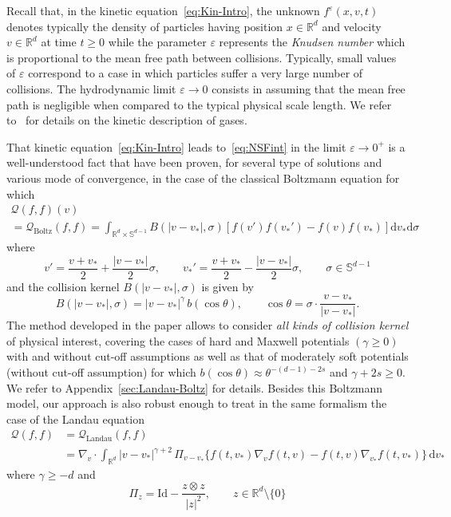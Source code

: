 \documentclass[AHL,Unicode,longabstracts,published]{cedram}
\newcommand{\Id}{\mathrm{Id}}
\renewcommand{\d}{\mathrm{d}}
\newcommand{\rLandau}{\mathrm{Landau}}
\newcommand{\rBoltz}{\mathrm{Boltz}}
\newcommand{\R}{\mathbb{R}}
\renewcommand{\S}{\mathbb{S}}
\newcommand{\QQ}{\mathcal{Q}}
\renewcommand*\ge{\geqslant}
\renewcommand*\geq{\geqslant}
\newcommand*\eps{{\varepsilon}}
\begin{document}
Recall that, in the kinetic equation~\eqref{eq:Kin-Intro}, the unknown $f^\eps(x,v,t)$ denotes typically the density of particles having position $x \in \R^{d}$ and velocity $v \in \R^{d}$ at time $t\geq0$ while the parameter $\eps$ represents the \emph{Knudsen number} which is proportional to the mean free path between collisions. Typically, small values of $\eps$ correspond to a case in which particles suffer a very large number of collisions. The hydrodynamic limit $\eps \to 0$ consists in assuming that the mean free path is negligible when compared to the typical physical scale length. We refer to~\cite{Cercignani,Sone} for details on the kinetic description of gases.

That kinetic equation~\eqref{eq:Kin-Intro} leads to~\eqref{eq:NSFint} in the limit $\eps \to 0^{+}$ is a well-understood fact that have been proven, for several type of solutions and various mode of convergence, in the case of the classical Boltzmann equation for which
\begin{multline}\label{eq:QQBoltz}
\QQ(f,f)(v)\\
=\QQ_{\rBoltz}(f,f)=\int_{\R^{d}\times\S^{d-1}}B(|v-v_{*}|,\sigma)\left[f(v')f(v_{*}')-f(v)f(v_{*})\right]\d v_{*}\d\sigma
\end{multline}
where
\[
v'=\frac{v+v_*}{2}+\frac{|v-v_*|}{2}\sigma, \qquad v_{*}'=\frac{v+v_*}{2}-\frac{|v-v_*|}{2}\sigma, \qquad \sigma \in \S^{d-1}
\]
and the collision kernel $B(|v-v_{*}|,\sigma)$ is given by
\[
B(|v-v_{*}|,\sigma)=|v-v_{*}|^{\gamma}\,b(\cos\theta), \qquad \cos \theta=\sigma \cdot \frac{v-v_{*}}{|v-v_{*}|}.
\]
The method developed in the paper allows to consider \emph{all kinds of collision kernel} of physical interest, covering the cases of hard {and Maxwell} potentials $(\gamma \ge 0)$ with and without cut-off assumptions as well as that of moderately soft potentials {(without cut-off assumption) for which $b(\cos \theta) \approx \theta^{-(d-1) - 2 s}$ and $\gamma + 2 s \ge 0$}. We refer to Appendix~\ref{sec:Landau-Boltz} for details. Besides this Boltzmann model, our approach is also robust enough to treat in the same formalism the case of the Landau equation
\begin{align*}
\QQ(f,f)&=\QQ_{\rLandau}(f,f)\\
&=\nabla_{v}\cdot \int_{\R^{d}} |v-v_{*}|^{\gamma+2} \, \Pi_{v-v_{*}}
\Big\{f(t,v_{*}) \nabla_{v} f(t,v) - f(t,v) {\nabla_{v_{*}} f}(t,v_{*}) \Big\}
\, \d v_{*}
\end{align*}
where {$\gamma \geq -d$} and
\[
\Pi_{z}=\Id-\frac{z \otimes z}{|z|^{2}}, \qquad z \in \R^{d} \setminus \{0\}
\]
\end{document}
